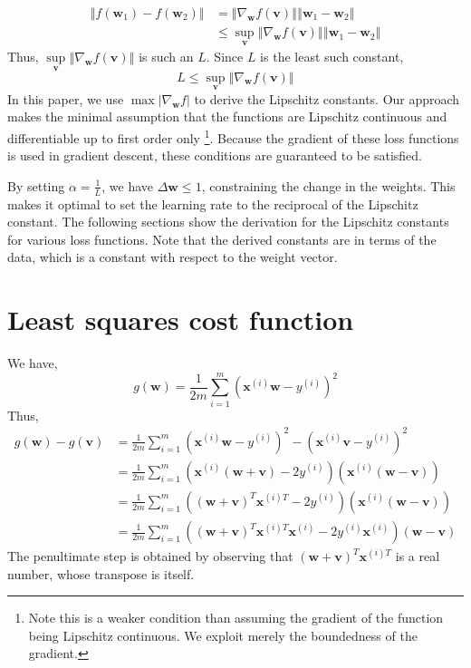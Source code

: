 \documentclass{article}
\begin{document}
\[
    \begin{aligned}
        \left\Vert f(\textbf{w}_1) - f(\textbf{w}_2) \right\Vert &= \left\Vert \nabla_{\textbf{w}} f(\textbf{v}) \right\Vert \left\Vert \textbf{w}_1-\textbf{w}_2 \right\Vert \\
        &\leq \sup\limits_{\textbf{v}} \left\Vert \nabla_{\textbf{w}} f(\textbf{v}) \right\Vert \left\Vert \textbf{w}_1-\textbf{w}_2 \right\Vert
    \end{aligned}
\]
Thus, $\sup\limits_{\textbf{v}} \left\Vert \nabla_{\textbf{w}} f(\textbf{v}) \right\Vert$ is such an $L$. Since $L$ is the least such constant, 
\[
    L \leq \sup\limits_{\textbf{v}} \left\Vert \nabla_{\textbf{w}} f(\textbf{v}) \right\Vert
\]
In this paper, we use $\max |\nabla_{\textbf{w}} f|$ to derive the Lipschitz constants. Our approach makes the minimal assumption that the functions are Lipschitz continuous and differentiable up to first order only \footnote{Note this is a weaker condition than assuming the gradient of the function being Lipschitz continuous. We exploit merely the boundedness of the gradient.}. Because the gradient of these loss functions is used in gradient descent, these conditions are guaranteed to be satisfied.

By setting $\alpha = \frac{1}{L}$, we have $\Delta \textbf{w} \leq 1$, constraining the change in the weights. This makes it optimal to set the learning rate to the reciprocal of the Lipschitz constant. The following sections show the derivation for the Lipschitz constants for various loss functions. Note that the derived constants are in terms of the data, which is a constant with respect to the weight vector. 

\section{Least squares cost function} \label{lstsq}
We have,
\[
    g(\textbf{w}) = \frac{1}{2m}\sum\limits_{i=1}^m \left(\textbf{x}^{(i)} \textbf{w} - y^{(i)}\right)^2
\]
Thus,
\[
    \begin{aligned}
        g(\textbf{w}) - g(\textbf{v}) &= \frac{1}{2m}\sum\limits_{i=1}^m \left(\textbf{x}^{(i)} \textbf{w} - y^{(i)}\right)^2 - \left(\textbf{x}^{(i)} \textbf{v} - y^{(i)}\right)^2 \\
        &= \frac{1}{2m}\sum\limits_{i=1}^m \left( \textbf{x}^{(i)}(\textbf{w}+\textbf{v}) - 2y^{(i)}\right) \left( \textbf{x}^{(i)} (\textbf{w}-\textbf{v}) \right) \\
        &= \frac{1}{2m}\sum\limits_{i=1}^m \left( (\textbf{w}+\textbf{v})^T \textbf{x}^{(i)T} - 2y^{(i)}\right) \left( \textbf{x}^{(i)} (\textbf{w}-\textbf{v}) \right) \\
        &= \frac{1}{2m}\sum\limits_{i=1}^m \left( (\textbf{w} + \textbf{v})^T \textbf{x}^{(i)T}\textbf{x}^{(i)} - 2y^{(i)}\textbf{x}^{(i)} \right) (\textbf{w}-\textbf{v}) 
    \end{aligned}
\]
The penultimate step is obtained by observing that $(\textbf{w}+\textbf{v})^T \textbf{x}^{(i)T}$ is a real number, whose transpose is itself.
\end{document}
